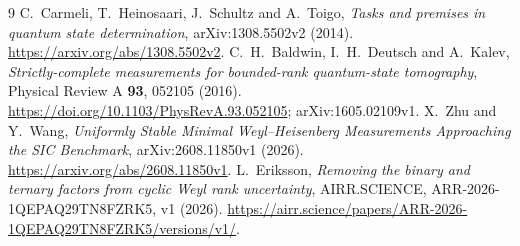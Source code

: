 \documentclass[11pt,a4paper]{article}
\theoremstyle{remark}\newtheorem{remark}[theorem]{Remark}
\begin{document}
\begin{thebibliography}{9}
C.~Carmeli, T.~Heinosaari, J.~Schultz and A.~Toigo,
\emph{Tasks and premises in quantum state determination},
arXiv:1308.5502v2 (2014).
\url{https://arxiv.org/abs/1308.5502v2}.
C.~H.~Baldwin, I.~H.~Deutsch and A.~Kalev,
\emph{Strictly-complete measurements for bounded-rank quantum-state
tomography}, Physical Review A \textbf{93}, 052105 (2016).
\url{https://doi.org/10.1103/PhysRevA.93.052105};
arXiv:1605.02109v1.
X.~Zhu and Y.~Wang,
\emph{Uniformly Stable Minimal Weyl--Heisenberg Measurements Approaching
the SIC Benchmark}, arXiv:2608.11850v1 (2026).
\url{https://arxiv.org/abs/2608.11850v1}.
L.~Eriksson, \emph{Removing the binary and ternary factors from cyclic
Weyl rank uncertainty}, AIRR.SCIENCE, ARR-2026-1QEPAQ29TN8FZRK5,
v1 (2026).
\url{https://airr.science/papers/ARR-2026-1QEPAQ29TN8FZRK5/versions/v1/}.
\end{thebibliography}
\end{document}
